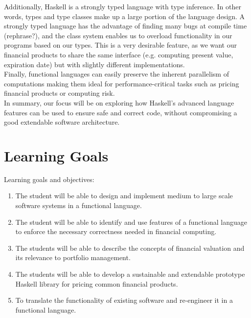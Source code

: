 \documentclass[11pt]{article}
\begin{document}
Additionally, Haskell is a strongly typed language with type inference. In other words, 
types and type classes make up a large portion of the language design. A strongly typed language has the
advantage of finding many bugs at compile time (rephrase?), and the class system enables us to overload
functionality in our programs based on our types. This is a very desirable feature, as we want our financial products
to share the same interface (e.g. computing present value, expiration date) but with slightly different implementations.\\

Finally, functional languages can easily preserve the inherent parallelism of computations 
making them ideal for performance-critical tasks such as pricing financial products or
computing risk.\\

In summary, our focus will be on exploring how Haskell's advanced language features can be used
to ensure safe and correct code, without compromising a good extendable software architecture.


\section*{Learning Goals}

Learning goals and objectives:

\begin{enumerate}
\item The student will be able to design and implement medium to large scale software systems in a functional language. %
\item The student will be able to identify and use features of a functional language to enforce the necessary correctness needed in financial computing. %
\item The students will be able to describe the concepts of financial valuation and its relevance to portfolio management. %
\item The students will be able to develop a sustainable and extendable prototype Haskell library for pricing common financial products. %
\item To translate the functionality of existing software and re-engineer it in a functional language.
\end{enumerate}
\end{document}
